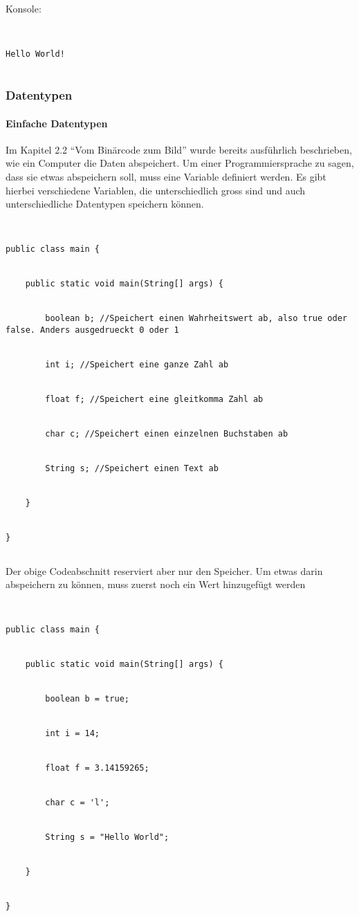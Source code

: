 Konsole:


\begin{lstlisting}[style=console]


Hello World!


\end{lstlisting}


\subsubsection{Datentypen}


\paragraph{Einfache Datentypen}


Im Kapitel 2.2 "`Vom Binärcode zum Bild"' wurde bereits ausführlich beschrieben, wie ein Computer die Daten abspeichert. Um einer Programmiersprache zu sagen, dass sie etwas abspeichern soll, muss eine Variable definiert werden. Es gibt hierbei verschiedene Variablen, die unterschiedlich gross sind und auch unterschiedliche Datentypen speichern können.


\begin{lstlisting}


public class main {


	public static void main(String[] args) {


		boolean b; //Speichert einen Wahrheitswert ab, also true oder false. Anders ausgedrueckt 0 oder 1


		int i; //Speichert eine ganze Zahl ab


		float f; //Speichert eine gleitkomma Zahl ab


		char c; //Speichert einen einzelnen Buchstaben ab


		String s; //Speichert einen Text ab


	}


}


\end{lstlisting}


Der obige Codeabschnitt reserviert aber nur den Speicher. Um etwas darin abspeichern zu können, muss zuerst noch ein Wert hinzugefügt werden


\begin{lstlisting}


public class main {


	public static void main(String[] args) {


		boolean b = true;


		int i = 14;


		float f = 3.14159265;


		char c = 'l';


		String s = "Hello World";


	}


}


\end{lstlisting}



